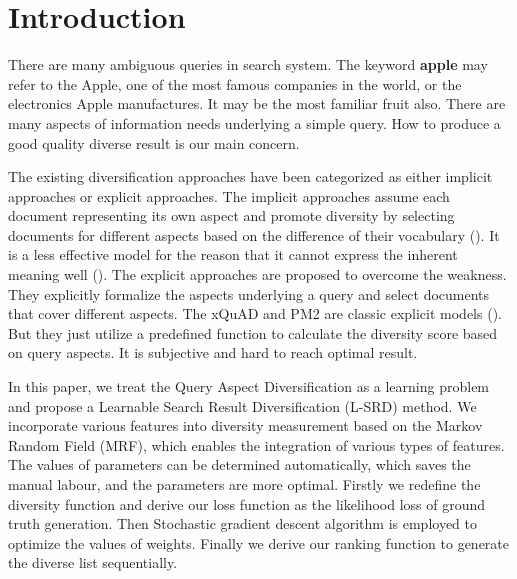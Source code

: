 \documentclass[review]{elsarticle}
\newcommand\revised[1]{{\color{black} #1}}
\begin{document}
\section{Introduction}
There are many ambiguous queries in search system. The keyword \textbf{apple} may refer to the Apple, one of the most famous companies in the world, or the electronics Apple manufactures. It may be the most familiar fruit also. There are many aspects of information needs underlying a simple query. How to produce a good quality diverse result is our main concern. 


\revised{
	The existing diversification approaches have been categorized as either implicit approaches or explicit approaches. The implicit approaches assume each document representing its own aspect and promote diversity by selecting documents for different aspects based on the difference of their vocabulary (\cite{carbonell1998use}). It is a less effective model for the reason that it cannot express the inherent meaning well (\cite{agrawal2009diversifying,zhai2003beyond}). 
	The explicit approaches are proposed to overcome the weakness. They explicitly formalize the aspects underlying a query and select documents that cover different aspects. The xQuAD and PM2 are classic explicit models (\cite{santos2010exploiting,dang2012diversity}).
	But they just utilize a predefined function to calculate the diversity score based on query aspects. It is subjective and hard to reach optimal result.}


In this paper, we treat the Query Aspect Diversification as a learning problem and propose a Learnable Search Result Diversification (L-SRD) method. We incorporate various features into diversity measurement based on the Markov Random Field (MRF), which enables the integration of various types of features. The values of parameters can be determined automatically, which saves the manual labour, and the parameters are more optimal. Firstly we redefine the diversity function and derive our loss function as the likelihood loss of ground truth generation. Then Stochastic gradient descent algorithm is employed to optimize the values of weights. Finally we derive our ranking function to generate the diverse list sequentially.

\end{document}
